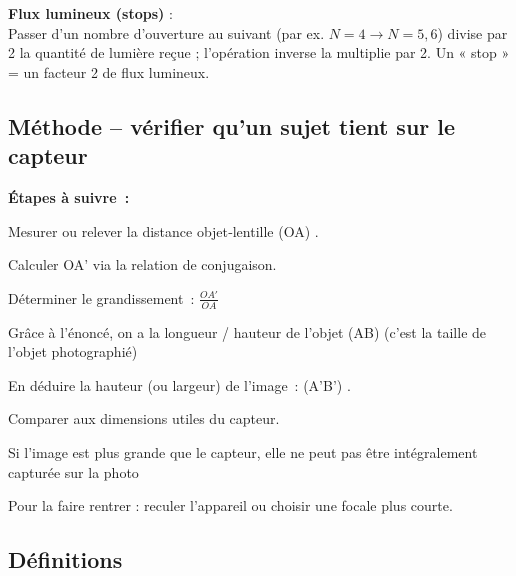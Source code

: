 \documentclass[a4paper,12pt]{article}
\begin{document}
\begin{tcolorbox}[colback=blue!5!white, colframe=blue!75!black,
                  title=Formules essentielles en optique photographique, breakable]
\begin{compactitem}
  \item \textbf{Flux lumineux (stops)} :\\
        Passer d’un nombre d’ouverture au suivant (par ex. \(N = 4 \rightarrow N = 5{,}6\)) divise par 2 la quantité de lumière reçue ; l’opération inverse la multiplie par 2. Un « stop » = un facteur 2 de flux lumineux.
\end{compactitem}
\end{tcolorbox}

\subsection*{Méthode – vérifier qu'un sujet tient sur le capteur}

\begin{tcolorbox}[colback=blue!10!white, colframe=blue!75!black, title=Méthode : le sujet tient‑il dans l’image ?, breakable]
\textbf{Étapes à suivre :}
\begin{compactitem}
\item Mesurer ou relever la distance objet‑lentille (OA) .
\item Calculer OA' via la relation de conjugaison.
\item Déterminer le grandissement : $\frac{OA'}{OA}$
\item Grâce à l'énoncé, on a la longueur / hauteur de l'objet (AB) (c'est la taille de l'objet photographié)
\item En déduire la hauteur (ou largeur) de l’image : (A'B') .
\item Comparer  aux dimensions utiles du capteur.
\item Si l’image est plus grande que le capteur, elle ne peut pas être intégralement capturée sur la photo 
\item Pour la faire rentrer : reculer l’appareil ou choisir une focale plus courte.
\end{compactitem}
\end{tcolorbox}

\subsection*{Définitions}
\end{document}
